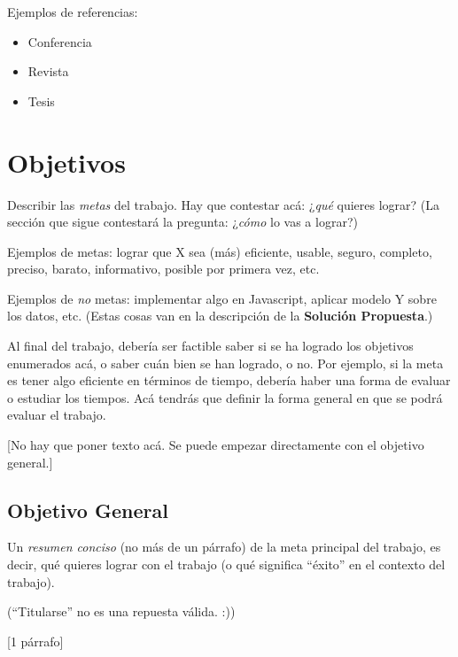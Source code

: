\documentclass[guia]{upropuesta}
\begin{document}
Ejemplos de referencias:

\begin{itemize}
  \item Conferencia~\cite{CorlessJK97}
  \item Revista~\cite{NewmanT42}
  \item Tesis~\cite{Turing38}
\end{itemize}


\section{Objetivos}\label{chap:obj}

\begin{pauta}
Describir las \textit{metas} del trabajo. Hay que contestar acá: ¿\textit{qué} quieres lograr? (La sección que sigue contestará la pregunta: ¿\textit{cómo} lo vas a lograr?)

Ejemplos de metas: lograr que X sea (más) eficiente, usable, seguro, completo, preciso, barato, informativo, posible por primera vez, etc.

Ejemplos de \textit{no} metas: implementar algo en Javascript, aplicar modelo Y sobre los datos, etc. (Estas cosas van en la descripción de la \textbf{Solución Propuesta}.)

Al final del trabajo, debería ser factible saber si se ha logrado los objetivos enumerados acá, o saber cuán bien se han logrado, o no. Por ejemplo, si la meta es tener algo eficiente en términos de tiempo, debería haber una forma de evaluar o estudiar los tiempos. Acá tendrás que definir la forma general en que se podrá evaluar el trabajo.

[No hay que poner texto acá. Se puede empezar directamente con el objetivo general.]
\end{pauta}

  \subsection*{Objetivo General}\label{sec:obj-g}
  
  \begin{pauta}
  Un \textit{resumen conciso} (no más de un párrafo) de la meta principal del trabajo, es decir, qué quieres lograr con el trabajo (o qué significa ``éxito'' en el contexto del trabajo).
  
  (``Titularse'' no es una repuesta válida. :))
  
  [1 párrafo]
  \end{pauta}
\end{document}
